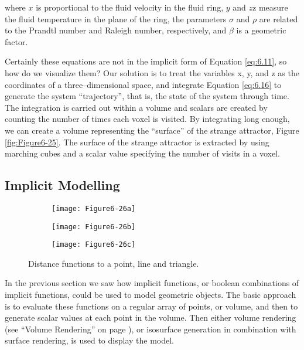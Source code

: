 \begin{description}[leftmargin=0cm,labelindent=0cm]
where $x$ is proportional to the fluid velocity in the fluid ring, $y$ and $z$z measure the fluid temperature in the plane of the ring, the parameters $\sigma$ and $\rho$ are related  to the Prandtl number and Raleigh number, respectively, and $\beta$ is a geometric factor.

Certainly these equations are not in the implicit form of Equation \ref{eq:6.11}, so how do we visualize them? Our solution is to treat the variables x, y, and z as the coordinates of a three--dimensional space, and integrate Equation \ref{eq:6.16} to generate the system ``trajectory'', that is, the state of the system through time. The integration is carried out within a volume and scalars are created by counting the number of times each voxel is visited. By integrating long enough, we can create a volume representing the ``surface'' of the strange attractor, Figure \ref{fig:Figure6-25}. The surface of the strange attractor is extracted by using marching cubes and a scalar value specifying the number of visits in a voxel.

\end{description}

\subsection{Implicit Modelling}
\label{subsec:implicit_modelling}

\begin{figure}[htb]
	\begin{subfigure}[h]{0.24\linewidth}
		\texttt{[image: Figure6-26a]}
		\label{fig:Figure6-26a}
	\end{subfigure}
	\hfill
	\begin{subfigure}[h]{0.24\linewidth}
		\texttt{[image: Figure6-26b]}
		\label{fig:Figure6-26b}
	\end{subfigure}
	\hfill
	\begin{subfigure}[h]{0.24\linewidth}
		\texttt{[image: Figure6-26c]}
		\label{fig:Figure6-26c}
	\end{subfigure}
	\caption{Distance functions to a point, line and triangle.}\label{fig:Figure6-26}
\end{figure}

In the previous section we saw how implicit functions, or boolean combinations of implicit functions, could be used to model geometric objects. The basic approach is to evaluate these functions on a regular array of points, or volume, and then to generate scalar values at each point in the volume. Then either volume rendering (see ``Volume Rendering'' on page \pageref{sec:volume_rendering} ), or isosurface generation in combination with surface rendering, is used to display the model.

